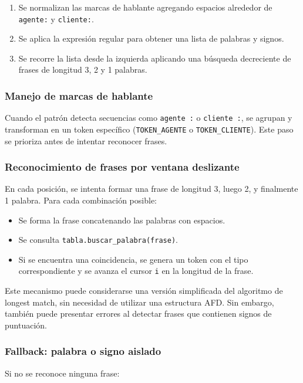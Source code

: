 \begin{enumerate}
	\item Se normalizan las marcas de hablante agregando espacios alrededor de \texttt{agente:}
	      y \texttt{cliente:}.

	\item Se aplica la expresión regular para obtener una lista de palabras y signos.

	\item Se recorre la lista desde la izquierda aplicando una búsqueda decreciente de frases
	      de longitud 3, 2 y 1 palabras.
\end{enumerate}

\subsubsection{Manejo de marcas de hablante}
Cuando el patrón detecta secuencias como \texttt{agente :} o \texttt{cliente :}, se agrupan y
transforman en un token específico (\texttt{TOKEN\_AGENTE} o \texttt{TOKEN\_CLIENTE}). Este
paso se prioriza antes de intentar reconocer frases.

\subsubsection{Reconocimiento de frases por ventana deslizante}
En cada posición, se intenta formar una frase de longitud 3, luego 2, y finalmente 1 palabra.
Para cada combinación posible:

\begin{itemize}
	\item Se forma la frase concatenando las palabras con espacios.

	\item Se consulta \texttt{tabla.buscar\_palabra(frase)}.

	\item Si se encuentra una coincidencia, se genera un token con el tipo correspondiente y se
	      avanza el cursor \texttt{i} en la longitud de la frase.
\end{itemize}

Este mecanismo puede considerarse una versión simplificada del algoritmo de longest match, sin
necesidad de utilizar una estructura AFD. Sin embargo, también puede presentar errores al
detectar frases que contienen signos de puntuación.

\subsubsection{Fallback: palabra o signo aislado}
Si no se reconoce ninguna frase:

